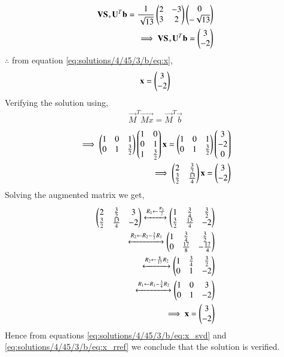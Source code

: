 \begin{align}
\mathbf{V}\mathbf{S}_+\mathbf{U}^T\mathbf{b} = \frac{1}{\sqrt{13}}\begin{pmatrix}2&-3\\3&2\end{pmatrix}\begin{pmatrix}0\\-\sqrt{13}\end{pmatrix}\\
\implies \mathbf{V}\mathbf{S}_+\mathbf{U}^T\mathbf{b} = \begin{pmatrix}3\\-2\end{pmatrix}
\end{align}
$\therefore$ from equation \eqref{eq:solutions/4/45/3/b/eq:x},
\begin{align}
\mathbf{x} = \begin{pmatrix}3 \\ -2 \end{pmatrix} \label{eq:solutions/4/45/3/b/eq:x_svd}
\end{align}
Verifying the solution using,
\begin{align}
\vec{M}^T\vec{Mx} = \vec{M}^T\vec{b}
\end{align}
\begin{align}
\implies \begin{pmatrix}1&0&1\\0&1&\frac{3}{2}\end{pmatrix} \begin{pmatrix}1&0\\0&1\\1&\frac{3}{2}\end{pmatrix} \mathbf{x} = \begin{pmatrix}1&0&1\\0&1&\frac{3}{2}\end{pmatrix}\begin{pmatrix}3\\-2\\0\end{pmatrix}\\
\implies \begin{pmatrix}2&\frac{3}{2}\\\frac{3}{2}&\frac{13}{4}\end{pmatrix}\mathbf{x} = \begin{pmatrix}3\\-2\end{pmatrix}
\end{align}
Solving the augmented matrix we get,
\begin{align}
\begin{pmatrix}2&\frac{3}{2}&3\\\frac{3}{2}&\frac{13}{4}&-2\end{pmatrix}\xleftrightarrow[]{R_1\leftarrow\frac{R_1}{2}}\begin{pmatrix}1 &\frac{3}{4}&\frac{3}{2}\\\frac{3}{2}&\frac{13}{4}&-2\end{pmatrix}\\
\xleftrightarrow[]{R_2\leftarrow R_2-\frac{3}{2}R_1}\begin{pmatrix}1&\frac{3}{4}&\frac{3}{2}\\0&\frac{17}{8}&-\frac{17}{4}\end{pmatrix}\\
\xleftrightarrow[]{R_2\leftarrow \frac{8}{17}R_2}\begin{pmatrix}1&\frac{3}{4}&\frac{3}{2}\\0&1&-2\end{pmatrix}\\
\xleftrightarrow[]{R_1\leftarrow R_1-\frac{3}{4}R_2}\begin{pmatrix}1&0&3\\0&1&-2\end{pmatrix}\\
\implies \mathbf{x} = \begin{pmatrix}3\\-2 \end{pmatrix}\label{eq:solutions/4/45/3/b/eq:x_rref}
\end{align}
Hence from equations \eqref{eq:solutions/4/45/3/b/eq:x_svd} and \eqref{eq:solutions/4/45/3/b/eq:x_rref} we conclude that the solution is verified.
